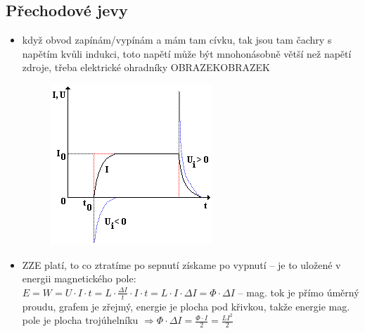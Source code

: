 \documentclass{article}
\begin{document}
\subsection{Přechodové jevy}
\begin{itemize}
  \item když obvod zapínám/vypínám a mám tam cívku, tak jsou tam čachry s napětím kvůli indukci, toto napětí může být mnohonásobně větší než napětí zdroje, třeba elektrické ohradníky OBRAZEKOBRAZEK \begin{figure}[h]
      \includegraphics[width=0.3\linewidth]{prechodove_jevy.png}
      \caption{}
  \end{figure}
  \item ZZE platí, to co ztratíme po sepnutí získame po vypnutí -- je to uložené v energii magnetického pole:\\ $E = W = U \cdot I \cdot t = L \cdot \frac{\Delta I}{t} \cdot I \cdot t = L \cdot I \cdot \Delta I = \Phi \cdot \Delta I$ -- mag. tok je přímo úměrný proudu, grafem je zřejmý, energie je plocha pod křivkou, takže energie mag. pole je plocha trojúhelníku $\Rightarrow \Phi \cdot \Delta I = \frac{\Phi \cdot I}{2} = \frac{LI^2}{2}$
\end{itemize}
\end{document}
